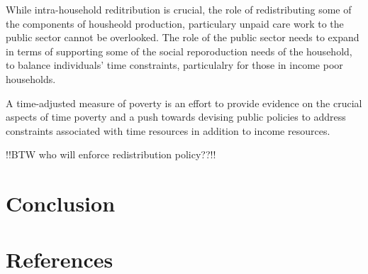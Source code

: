 \documentclass[
  11pt,
]{article}
\begin{document}
While intra-household reditribution is crucial, the role of
redistributing some of the components of housheold production,
particulary unpaid care work to the public sector cannot be overlooked.
The role of the public sector needs to expand in terms of supporting
some of the social reporoduction needs of the household, to balance
individuals' time constraints, particulalry for those in income poor
households.

A time-adjusted measure of poverty is an effort to provide evidence on
the crucial aspects of time poverty and a push towards devising public
policies to address constraints associated with time resources in
addition to income resources.

!!BTW who will enforce redistribution policy??!!

\section{Conclusion}\label{conclusion}

\section*{References}\label{sec-ref}
\end{document}
